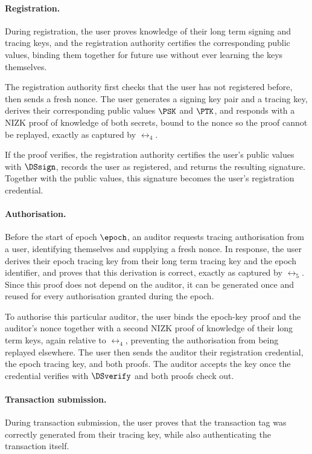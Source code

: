 \paragraph{Registration.} During registration, the user proves knowledge of
their long term signing and tracing keys, and the registration authority
certifies the corresponding public values, binding them together for future use
without ever learning the keys themselves.

The registration authority first checks that the user has not registered
before, then sends a fresh nonce. The user generates a signing key pair and a
tracing key, derives their corresponding public values $\PSK$ and $\PTK$, and
responds with a NIZK proof of knowledge of both secrets, bound to the nonce so
the proof cannot be replayed, exactly as captured by $\rel_4$.

If the proof verifies, the registration authority certifies the user's public
values with $\DSsign$, records the user as registered, and returns the
resulting signature. Together with the public values, this signature becomes
the user's registration credential.

\paragraph{Authorisation.} Before the start of epoch $\epoch$, an auditor
requests tracing authorisation from a user, identifying themselves and
supplying a fresh nonce. In response, the user derives their epoch tracing key
from their long term tracing key and the epoch identifier, and proves that this
derivation is correct, exactly as captured by $\rel_5$. Since this proof does
not depend on the auditor, it can be generated once and reused for every
authorisation granted during the epoch.

To authorise this particular auditor, the user binds the epoch-key proof and
the auditor's nonce together with a second NIZK proof of knowledge of their
long term keys, again relative to $\rel_4$, preventing the authorisation from
being replayed elsewhere. The user then sends the auditor their registration
credential, the epoch tracing key, and both proofs. The auditor accepts the key
once the credential verifies with $\DSverify$ and both proofs check out.

\paragraph{Transaction submission.} During transaction submission, the user
proves that the transaction tag was correctly generated from their tracing key,
while also authenticating the transaction itself.

